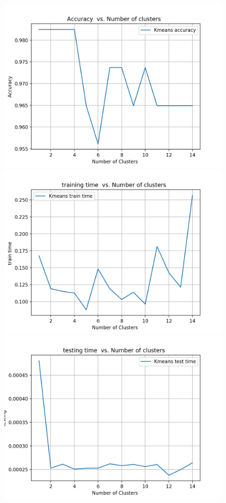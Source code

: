 \documentclass[a4paper,12pt]{article}
\begin{document}
\begin{figure}[!htb]
   \begin{minipage}{0.25\textwidth}
     \centering
     \includegraphics[width=.95\linewidth]{kmeans_nn_acc_5}
   \end{minipage}\hfill
    \begin{minipage}{0.25\textwidth}
     \centering
     \includegraphics[width=.95\linewidth]{train_time_kmeans_5}
     \end{minipage}\hfill
     \begin{minipage}{0.25\textwidth}
     \centering
     \includegraphics[width=.95\linewidth]{test_time_nn_5}

\end{minipage}
\end{figure}
\end{document}
